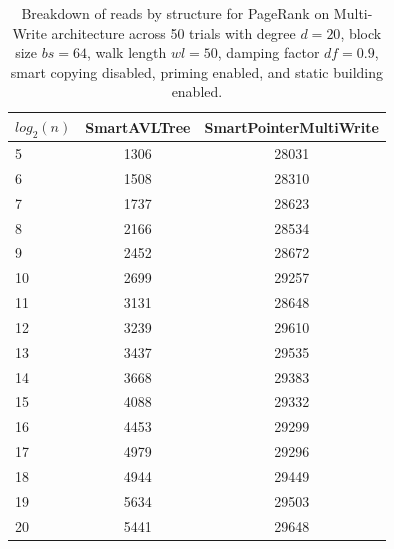\begin{table}[]
\centering
\begin{tabular}{|l|c|c|}
$log_2(n)$ & SmartAVLTree & SmartPointerMultiWrite \\ \hline
5 & 1306 & 28031 \\ \hline
6 & 1508 & 28310 \\ \hline
7 & 1737 & 28623 \\ \hline
8 & 2166 & 28534 \\ \hline
9 & 2452 & 28672 \\ \hline
10 & 2699 & 29257 \\ \hline
11 & 3131 & 28648 \\ \hline
12 & 3239 & 29610 \\ \hline
13 & 3437 & 29535 \\ \hline
14 & 3668 & 29383 \\ \hline
15 & 4088 & 29332 \\ \hline
16 & 4453 & 29299 \\ \hline
17 & 4979 & 29296 \\ \hline
18 & 4944 & 29449 \\ \hline
19 & 5634 & 29503 \\ \hline
20 & 5441 & 29648 \\ \hline
\end{tabular}
\caption{Breakdown of reads by structure for PageRank on Multi-Write architecture across 50 trials with degree $d=20$, block size $bs=64$, walk length $wl=50$, damping factor $df=0.9$, smart copying disabled, priming enabled, and static building enabled.}
    \label{tab:reads_by_structure_pr_d20_bs64_trials50_copiesfalse_primetrue_staticinsertiontrue_wl50_df0.9_ptmultiwrite_movetrue}
\end{table}

